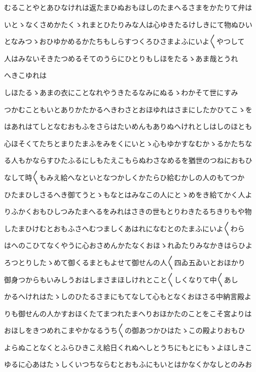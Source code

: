 \documentclass[a4paper,11pt,landscape]{ltjtarticle}
\begin{document}
\par\medskip
むることやとあひなけれは返たまひぬおもほしのたまへるさまをかたりて弁は
\par\medskip
いとゝなくさめかたくゝれまとひたりみな人は心ゆきたるけしきにて物ぬひい
\par\medskip
となみつゝおひゆかめるかたちもしらすつくろひさまよふにいよ〱やつして
\par\medskip
人はみないそきたつめるそてのうらにひとりもしほをたるゝあま哉とうれ
\par\medskip
へきこゆれは
\par\medskip
しほたるゝあまの衣にことなれやうきたるなみにぬるゝわかそて世にすみ
\par\medskip
つかむこともいとありかたかるへきわさとおほゆれはさまにしたかひてこゝを
\par\medskip
はあれはてしとなむおもふをさらはたいめんもありぬへけれとしはしのほとも
\par\medskip
心ほそくてたちとまりたまふをみをくにいとゝ心もゆかすなむかゝるかたちな
\par\medskip
る人もかならすひたふるにしもたえこもらぬわさなめるを猶世のつねにおもひ
\par\medskip
なして時〱もみえ給へなといとなつかしくかたらひ給むかしの人のもてつか
\par\medskip
ひたまひしさるへき御てうとゝもなとはみなこの人にとゝめをき給てかく人よ
\par\medskip
りふかくおもひしつみたまへるをみれはさきの世もとりわきたるちきりもや物
\par\medskip
したまひけむとおもふさへむつましくあはれになむとのたまふにいよ〱わら
\par\medskip
はへのこひてなくやうに心おさめんかたなくおほゝれゐたりみなかきはらひよ
\par\medskip
ろつとりしたゝめて御くるまともよせて御せんの人〱四ゐ五ゐいとおほかり
\par\medskip
御身つからもいみしうおはしまさまほしけれとこと〱しくなりて中〱あし
\par\medskip
かるへけれはたゝしのひたるさまにもてなして心もとなくおほさる中納言殿よ
\par\medskip
りも御せんの人かすおほくたてまつれたまへりおほかたのことをこそ宮よりは
\par\medskip
おほしをきつめれこまやかなるうち〱の御あつかひはたゝこの殿よりおもひ
\par\medskip
よらぬことなくとふらひきこえ給日くれぬへしとうちにもとにもゝよほしきこ
\par\medskip
ゆるに心あはたゝしくいつちならむとおもふにもいとはかなくかなしとのみお
\end{document}

